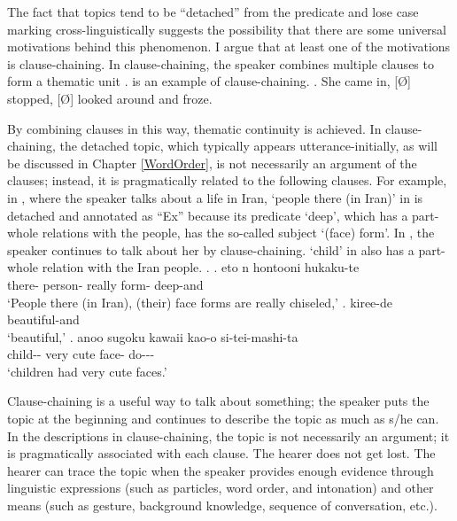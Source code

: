 The fact that topics tend to be ``detached'' from the predicate and
lose case marking cross-linguistically suggests the possibility that
there are some universal motivations behind this phenomenon.
I argue that at least one of the motivations is clause-chaining.
In clause-chaining,
the speaker combines multiple clauses to form a thematic unit
\cite{longacre85,martin92,givon01}.
\Next is an example of clause-chaining.
%
\ex. She came in, [\O] stopped, [\O] looked around and froze.\\
     \hfill{\cite[349]{givon01}}

By combining clauses in this way,
thematic continuity is achieved.
In clause-chaining,
the detached topic, which typically appears utterance-initially, as will be discussed in Chapter \ref{WordOrder},
is not necessarily an argument of the clauses;
instead, it is pragmatically related to the following clauses.
For example, in \Next,
where the speaker talks about a life in Iran,
 `people there (in Iran)' in \Next[a] is detached
and annotated as ``Ex''
because its predicate  `deep', which has a part-whole relations with the people, has the so-called subject  `(face) form'.
In \Next[b-c], the speaker continues to talk about her
by clause-chaining.
 `child' in \Next[c] also has a part-whole relation
with the Iran people.
%
\ex.
 \ag. eto n   hontooni  hukaku-te \\
        there- person- really form- deep-and \\
      `People there (in Iran), (their) face forms are really chiseled,'
 \bg. kiree-de \\
      beautiful-and \\
      `beautiful,'
 \bg.  anoo sugoku kawaii kao-o si-tei-mashi-ta \\
      child--  very cute face- do--- \\
      `children had very cute faces.'

Clause-chaining is a useful way to talk about something;
the speaker puts the topic at the beginning and
continues to describe the topic as much as s/he can.
In the descriptions in clause-chaining,
the topic is not necessarily an argument;
it is pragmatically associated with each clause.
The hearer does not get lost.
The hearer can trace the topic
when the speaker provides enough evidence
through linguistic expressions (such as particles, word order, and intonation) and other means (such as gesture, background knowledge, sequence of conversation, etc.).

